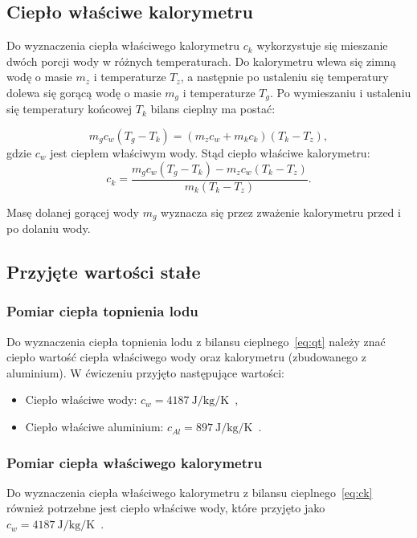 \documentclass[12pt, a4paper]{article}
\begin{document}
\subsection{Ciepło właściwe kalorymetru}

Do wyznaczenia ciepła właściwego kalorymetru $c_k$ wykorzystuje się mieszanie
dwóch porcji wody w różnych temperaturach. Do kalorymetru wlewa się zimną wodę
o masie $m_z$ i temperaturze $T_z$, a następnie po ustaleniu się temperatury
dolewa się gorącą wodę o masie $m_g$ i temperaturze $T_g$. Po wymieszaniu i
ustaleniu się temperatury końcowej $T_k$ bilans cieplny ma postać:

\begin{equation}
    m_g c_w (T_g - T_k) = (m_z c_w + m_k c_k)(T_k - T_z),
\end{equation}
gdzie $c_w$ jest ciepłem właściwym wody. Stąd ciepło właściwe kalorymetru:
\begin{equation}
    c_k = \frac{m_g c_w (T_g - T_k) - m_z c_w (T_k - T_z)}{m_k (T_k - T_z)}.
    \label{eq:ck}
\end{equation}

Masę dolanej gorącej wody $m_g$ wyznacza się przez zważenie kalorymetru przed i
po dolaniu wody.

\subsection{Przyjęte wartości stałe}
\subsubsection{Pomiar ciepła topnienia lodu}
Do wyznaczenia ciepła topnienia lodu z bilansu cieplnego~\eqref{eq:qt} należy
znać ciepło wartość ciepła właściwego wody oraz kalorymetru (zbudowanego z
aluminium). W ćwiczeniu przyjęto następujące wartości:

\begin{itemize}
    \item Ciepło właściwe wody: $c_w = \qty{4187}{\joule\per\kilogram\per\kelvin}$~\cite{skrypt},
    \item Ciepło właściwe aluminium: $c_{Al} = \qty{897}{\joule\per\kilogram\per\kelvin}$~\cite{emetal}.
\end{itemize}

\subsubsection{Pomiar ciepła właściwego kalorymetru}
Do wyznaczenia ciepła właściwego kalorymetru z bilansu cieplnego~\eqref{eq:ck}
również potrzebne jest ciepło właściwe wody, które przyjęto jako $c_w =
    \qty{4187}{\joule\per\kilogram\per\kelvin}$~\cite{skrypt}.
\end{document}
